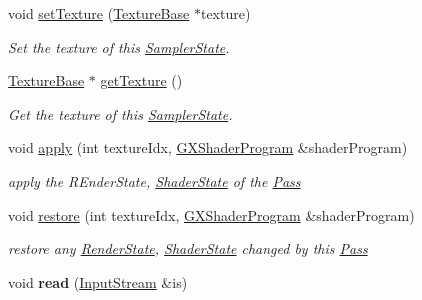 \begin{DoxyCompactItemize}
void \hyperlink{class_i_dream_sky_1_1_material_1_1_sampler_state_a3dc1f90e1be84f7e1aaa68aec15e2c0e}{set\+Texture} (\hyperlink{class_i_dream_sky_1_1_texture_base}{Texture\+Base} $\ast$texture)
\begin{DoxyCompactList}\small\item\em Set the texture of this \hyperlink{class_i_dream_sky_1_1_material_1_1_sampler_state}{Sampler\+State}. \end{DoxyCompactList}\item 
\hyperlink{class_i_dream_sky_1_1_texture_base}{Texture\+Base} $\ast$ \hyperlink{class_i_dream_sky_1_1_material_1_1_sampler_state_a2f3591af293e42bff7ee97cd5b66607f}{get\+Texture} ()
\begin{DoxyCompactList}\small\item\em Get the texture of this \hyperlink{class_i_dream_sky_1_1_material_1_1_sampler_state}{Sampler\+State}. \end{DoxyCompactList}\item 
void \hyperlink{class_i_dream_sky_1_1_material_1_1_sampler_state_a911ad0ef9f7cf8dbc7425652ecf89359}{apply} (int texture\+Idx, \hyperlink{class_i_dream_sky_1_1_g_x_shader_program}{G\+X\+Shader\+Program} \&shader\+Program)\hypertarget{class_i_dream_sky_1_1_material_1_1_sampler_state_a911ad0ef9f7cf8dbc7425652ecf89359}{}\label{class_i_dream_sky_1_1_material_1_1_sampler_state_a911ad0ef9f7cf8dbc7425652ecf89359}

\begin{DoxyCompactList}\small\item\em apply the R\+Ender\+State, \hyperlink{class_i_dream_sky_1_1_material_1_1_shader_state}{Shader\+State} of the \hyperlink{class_i_dream_sky_1_1_material_1_1_pass}{Pass} \end{DoxyCompactList}\item 
void \hyperlink{class_i_dream_sky_1_1_material_1_1_sampler_state_ab86b3a3a8483abe566a9bfe05d29f856}{restore} (int texture\+Idx, \hyperlink{class_i_dream_sky_1_1_g_x_shader_program}{G\+X\+Shader\+Program} \&shader\+Program)\hypertarget{class_i_dream_sky_1_1_material_1_1_sampler_state_ab86b3a3a8483abe566a9bfe05d29f856}{}\label{class_i_dream_sky_1_1_material_1_1_sampler_state_ab86b3a3a8483abe566a9bfe05d29f856}

\begin{DoxyCompactList}\small\item\em restore any \hyperlink{class_i_dream_sky_1_1_material_1_1_render_state}{Render\+State}, \hyperlink{class_i_dream_sky_1_1_material_1_1_shader_state}{Shader\+State} changed by this \hyperlink{class_i_dream_sky_1_1_material_1_1_pass}{Pass} \end{DoxyCompactList}\item 
void {\bfseries read} (\hyperlink{class_i_dream_sky_1_1_input_stream}{Input\+Stream} \&is)\hypertarget{class_i_dream_sky_1_1_material_1_1_sampler_state_a93a8ab16558f205122744cf587d3f423}{}\label{class_i_dream_sky_1_1_material_1_1_sampler_state_a93a8ab16558f205122744cf587d3f423}


\end{DoxyCompactItemize}
